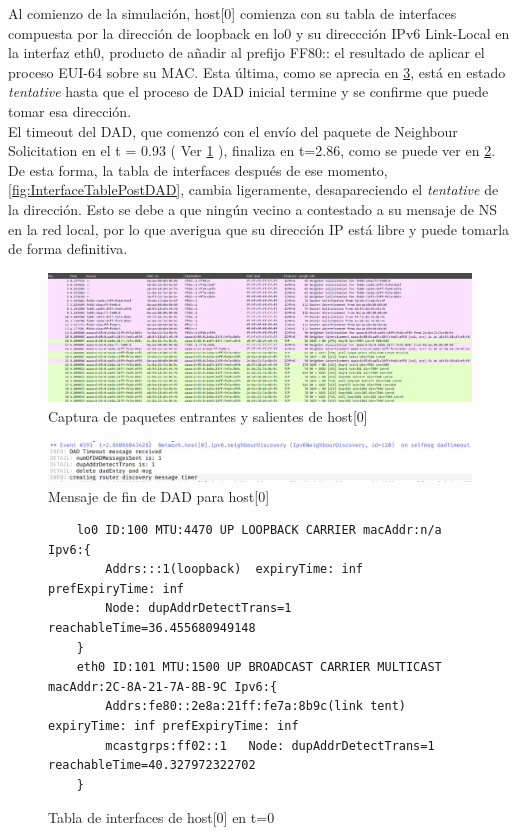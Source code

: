Al comienzo de la simulación, host[0] comienza con su tabla de interfaces compuesta por la dirección de loopback en lo0 y su direccción IPv6 Link-Local en la interfaz eth0, producto de añadir al prefijo FF80:: el resultado de aplicar el proceso EUI-64 sobre su MAC. Esta última, como se aprecia en \ref{fig:InterfaceTableInicial}, está en estado \textit{tentative} hasta que el proceso de DAD inicial termine y se confirme que puede tomar esa dirección. \\
El timeout del DAD, que comenzó con el envío del paquete de Neighbour Solicitation en el t = 0.93 ( Ver \ref{fig:paquetes_IPv6_host0} ), finaliza en t=2.86, como se puede ver en \ref{fig:DAD_host0}. \\
De esta forma, la tabla de interfaces después de ese momento, \ref{fig:InterfaceTablePostDAD}, cambia ligeramente, desapareciendo el \textit{tentative} de la dirección. Esto se debe a que ningún vecino a contestado a su mensaje de NS en la red local, por lo que averigua que su dirección IP está libre y puede tomarla de forma definitiva.

\begin{figure}[H]
    \centering
    \includegraphics[width=135mm, scale=0.75]{imaxes/ejercicio2_4_1.png}
    \caption{Captura de paquetes entrantes y salientes de host[0]}
    \label{fig:paquetes_IPv6_host0}
\end{figure}

\begin{figure}[H]
    \centering
    \includegraphics[width=135mm, scale=0.75]{imaxes/ejercicio2_4_2.png}
    \caption{Mensaje de fin de DAD para host[0]}
    \label{fig:DAD_host0}
\end{figure}

\begin{figure}[H]
    \centering
    \begin{lstlisting}
    lo0 ID:100 MTU:4470 UP LOOPBACK CARRIER macAddr:n/a Ipv6:{
        Addrs:::1(loopback)  expiryTime: inf prefExpiryTime: inf
        Node: dupAddrDetectTrans=1 reachableTime=36.455680949148
    }
    eth0 ID:101 MTU:1500 UP BROADCAST CARRIER MULTICAST macAddr:2C-8A-21-7A-8B-9C Ipv6:{
        Addrs:fe80::2e8a:21ff:fe7a:8b9c(link tent)  expiryTime: inf prefExpiryTime: inf
        mcastgrps:ff02::1 	Node: dupAddrDetectTrans=1 reachableTime=40.327972322702
    }
    \end{lstlisting}
    \caption{Tabla de interfaces de host[0] en t=0}
    \label{fig:InterfaceTableInicial}
\end{figure}


